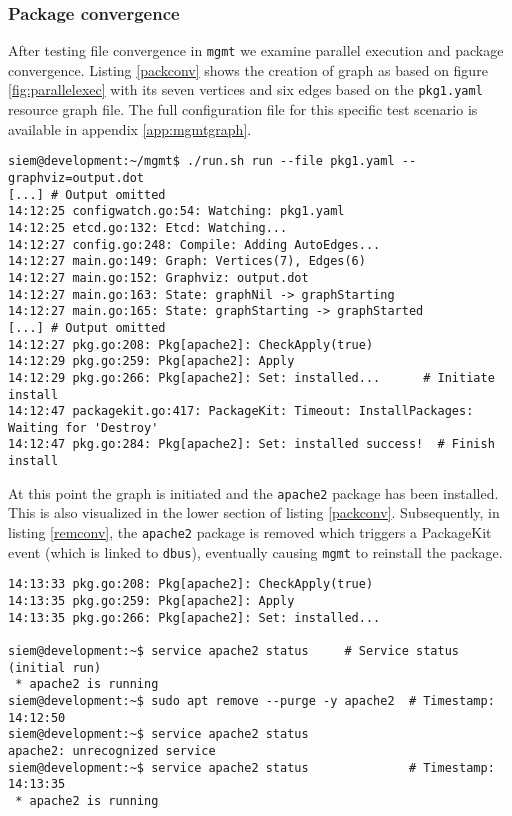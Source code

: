 \subsubsection{Package convergence}
After testing file convergence in \texttt{mgmt} we examine parallel execution and package convergence. Listing \ref{packconv} shows the creation of graph as based on figure \ref{fig:parallelexec} with its seven vertices and six edges based on the \texttt{pkg1.yaml} resource graph file. The full configuration file for this specific test scenario is available in appendix \ref{app:mgmtgraph}.
\\
\begin{lstlisting}[caption={Graph initiation for package convergence},label=packconv]
siem@development:~/mgmt$ ./run.sh run --file pkg1.yaml --graphviz=output.dot
[...] # Output omitted
14:12:25 configwatch.go:54: Watching: pkg1.yaml
14:12:25 etcd.go:132: Etcd: Watching...
14:12:27 config.go:248: Compile: Adding AutoEdges...
14:12:27 main.go:149: Graph: Vertices(7), Edges(6)
14:12:27 main.go:152: Graphviz: output.dot
14:12:27 main.go:163: State: graphNil -> graphStarting
14:12:27 main.go:165: State: graphStarting -> graphStarted
[...] # Output omitted
14:12:27 pkg.go:208: Pkg[apache2]: CheckApply(true)
14:12:29 pkg.go:259: Pkg[apache2]: Apply
14:12:29 pkg.go:266: Pkg[apache2]: Set: installed...      # Initiate install
14:12:47 packagekit.go:417: PackageKit: Timeout: InstallPackages: Waiting for 'Destroy'
14:12:47 pkg.go:284: Pkg[apache2]: Set: installed success!  # Finish install
\end{lstlisting}
\noindent
At this point the graph is initiated and the \texttt{apache2} package has been installed. This is also visualized in the lower section of listing \ref{packconv}. Subsequently, in listing \ref{remconv}, the \texttt{apache2} package is removed which triggers a PackageKit event (which is linked to \texttt{dbus}), eventually causing \texttt{mgmt} to reinstall the package. 
\\
\begin{lstlisting}[caption={PackageKit convergence in \texttt{mgmt}},label=remconv]
14:13:33 pkg.go:208: Pkg[apache2]: CheckApply(true)
14:13:35 pkg.go:259: Pkg[apache2]: Apply
14:13:35 pkg.go:266: Pkg[apache2]: Set: installed...

siem@development:~$ service apache2 status     # Service status (initial run)
 * apache2 is running
siem@development:~$ sudo apt remove --purge -y apache2  # Timestamp: 14:12:50
siem@development:~$ service apache2 status
apache2: unrecognized service
siem@development:~$ service apache2 status              # Timestamp: 14:13:35
 * apache2 is running
\end{lstlisting}

